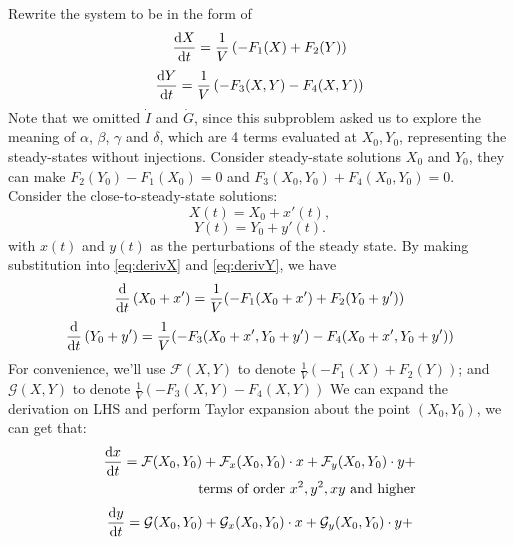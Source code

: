 \begin{homeworkProblem}
\begin{enumerate}
Rewrite the system to be in the form of 
\begin{equation}
    \deriv[t]{X} = \frac{1}{V}\left( - F_1(X) + F_2(Y)\right) \label{eq:derivX}
\end{equation}
\begin{equation}
    \deriv[t]{Y} = \frac{1}{V}\left(- F_3(X, Y) - F_4(X, Y)\right) \label{eq:derivY}
\end{equation}
Note that we omitted $\dot I$ and $\dot G$, since this subproblem asked us to explore the meaning of $\alpha$, $\beta$, $\gamma$ and $\delta$, which are 4 terms evaluated at $X_0, Y_0$, representing the steady-states without injections.
Consider steady-state solutions $X_0$ and $Y_0$, they can make $F_2(Y_0) - F_1(X_0) = 0$ and $ F_3 (X_0, Y_0) + F_4(X_0, Y_0) = 0$.
Consider the close-to-steady-state solutions:
\begin{equation}
    X(t) = X_0 + x'(t),
\end{equation}
\begin{equation}
     Y(t) = Y_0 + y'(t).
\end{equation}
with $x(t)$ and $y(t)$ as the perturbations of the steady state.
By making substitution into \eqref{eq:derivX} and \eqref{eq:derivY}, we have 
\begin{equation}
    \derivlong[t]{X_0 + x'} = \frac{1}{V}(-F_1(X_0+x') + F_2(Y_0+y'))
\end{equation}
\begin{equation}
    \derivlong[t]{Y_0 + y'} = \frac{1}{V}(-F_3(X_0+x', Y_0+y') - F_4(X_0+x', Y_0+y'))
\end{equation}
For convenience, we'll use $\mathcal{F}(X, Y)$ to denote $\frac{1}{V}(-F_1(X) + F_2(Y))$; and $\mathcal{G}(X, Y)$ to denote $\frac{1}{V}(-F_3(X,Y)-F_4(X,Y))$
We can expand the derivation on LHS and perform Taylor expansion about the point $(X_0, Y_0)$, we can get that:
\begin{equation}
\begin{split}
    \deriv[t]{x} = \mathcal{F}(X_0, Y_0) + \mathcal{F}_x(X_0, Y_0) \cdot x + \mathcal{F}_y(X_0, Y_0) \cdot y +\\
    \text{ terms of order }x^2, y^2, xy\text{ and higher}
\end{split}
\end{equation}
\begin{equation}
\begin{split}
    \deriv[t]{y} = \mathcal{G}(X_0, Y_0) + \mathcal{G}_x(X_0, Y_0) \cdot x + \mathcal{G}_y(X_0, Y_0) \cdot y +\\

\end{split}
\end{equation}
\end{enumerate}
\end{homeworkProblem}
